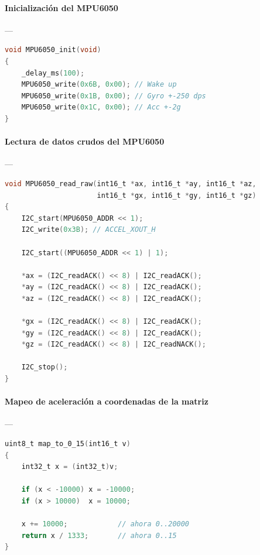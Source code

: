 \paragraph{Inicialización del MPU6050}\label{anexo:MPUinit}---
\begin{lstlisting}[language=C, caption={Inicialización del sensor MPU6050}]
void MPU6050_init(void)
{
    _delay_ms(100);
    MPU6050_write(0x6B, 0x00); // Wake up
    MPU6050_write(0x1B, 0x00); // Gyro +-250 dps
    MPU6050_write(0x1C, 0x00); // Acc +-2g
}
\end{lstlisting}

\paragraph{Lectura de datos crudos del MPU6050}\label{anexo:MPUread}---
\begin{lstlisting}[language=C, caption={Lectura de acelerómetro y giroscopio}]
void MPU6050_read_raw(int16_t *ax, int16_t *ay, int16_t *az,
                      int16_t *gx, int16_t *gy, int16_t *gz)
{
    I2C_start(MPU6050_ADDR << 1);
    I2C_write(0x3B); // ACCEL_XOUT_H

    I2C_start((MPU6050_ADDR << 1) | 1);

    *ax = (I2C_readACK() << 8) | I2C_readACK();
    *ay = (I2C_readACK() << 8) | I2C_readACK();
    *az = (I2C_readACK() << 8) | I2C_readACK();

    *gx = (I2C_readACK() << 8) | I2C_readACK();
    *gy = (I2C_readACK() << 8) | I2C_readACK();
    *gz = (I2C_readACK() << 8) | I2C_readNACK();

    I2C_stop();
}
\end{lstlisting}

\paragraph{Mapeo de aceleración a coordenadas de la matriz}\label{anexo:mapa}---
\begin{lstlisting}[language=C, caption={Función de mapeo a 0..15}]
uint8_t map_to_0_15(int16_t v)
{
    int32_t x = (int32_t)v;

    if (x < -10000) x = -10000;
    if (x > 10000)  x = 10000;

    x += 10000;            // ahora 0..20000
    return x / 1333;       // ahora 0..15
}
\end{lstlisting}

